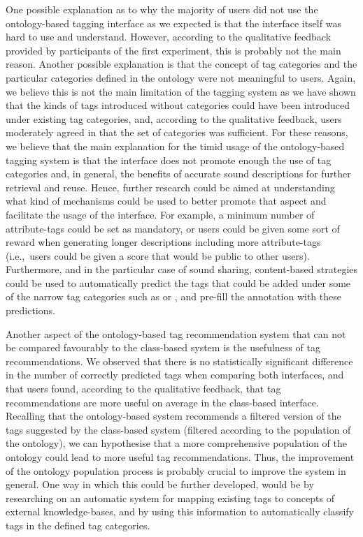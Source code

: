 One possible explanation as to why the majority of users did not use the ontology-based tagging interface as we expected is that the interface itself was hard to use and understand. However, according to the qualitative feedback provided by participants of the first experiment, this is probably not the main reason.
Another possible explanation is that the concept of tag categories and the particular categories defined in the ontology were not meaningful to users. Again, we believe this is not the main limitation of the tagging system as we have shown that the kinds of tags introduced without categories could have been introduced under existing tag categories, and, according to the qualitative feedback, users moderately agreed in that the set of categories was sufficient.
For these reasons, we believe that the main explanation for the timid usage of the ontology-based tagging system is that the interface does not promote enough the use of tag categories and, in general, the benefits of accurate sound descriptions for further retrieval and reuse. Hence, further research could be aimed at understanding what kind of mechanisms could be used to better promote that aspect and facilitate the usage of the interface. For example, a minimum number of attribute-tags could be set as mandatory, or users could be given some sort of reward when generating longer descriptions including more attribute-tags (i.e.,~users could be given a score that would be public to other users). Furthermore, and in the particular case of sound sharing, content-based strategies could be used to automatically predict the tags that could be added under some of the narrow tag categories such as  or , and pre-fill the annotation with these predictions.

Another aspect of the ontology-based tag recommendation system that can not be compared favourably to the class-based system is the usefulness of tag recommendations.
We observed that there is no statistically significant difference in the number of correctly predicted tags when comparing both interfaces, and that users found, according to the qualitative feedback, that tag recommendations are more useful on average in the class-based interface. 
Recalling that the ontology-based system recommends a filtered version of the tags suggested by the class-based system (filtered according to the population of the ontology), we can hypothesise that a more comprehensive population of the ontology could lead to more useful tag recommendations. Thus, the improvement of the ontology population process is probably crucial to improve the system in general. One way in which this could be further developed, would be by researching on an automatic system for mapping existing tags to concepts of external knowledge-bases, and by using this information to automatically classify tags in the defined tag categories.

